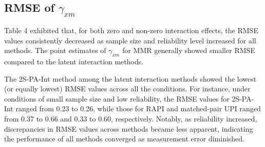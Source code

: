 \documentclass[
  man]{apa6}
\begin{document}
\subsection{\texorpdfstring{RMSE of \(\gamma_{xm}\)}{RMSE of \textbackslash gamma\_\{xm\}}}\label{rmse-of-gamma_xm}

Table 4 exhibited that, for both zero and non-zero interaction effects, the RMSE values consistently decreased as sample size and reliability level increased for all methods. The point estimates of \(\gamma_{xm}\) for MMR generally showed smaller RMSE compared to the latent interaction methods.

The 2S-PA-Int method among the latent interaction methods showed the lowest (or equally lowest) RMSE values across all the conditions. For instance, under conditions of small sample size and low reliability, the RMSE values for 2S-PA-Int ranged from 0.23 to 0.26, while those for RAPI and matched-pair UPI ranged from 0.37 to 0.66 and 0.33 to 0.60, respectively. Notably, as reliability increased, discrepancies in RMSE values across methods became less apparent, indicating the performance of all methods converged as measurement error diminished.
\end{document}
